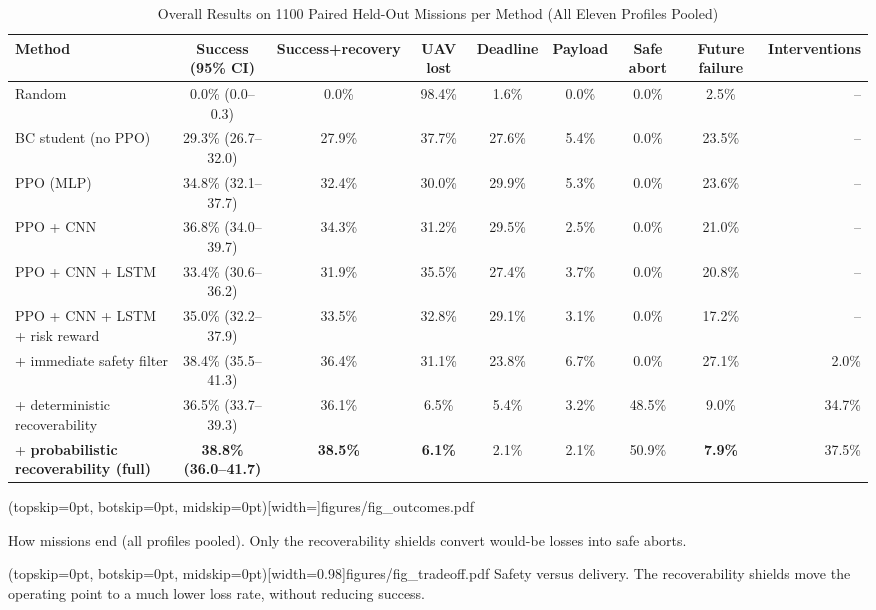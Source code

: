 \documentclass{ieeeaccess}
\newcommand{\widecap}[1]{\parbox[t]{0.89\textwidth}{\raggedright #1}}
\begin{document}
\begin{table}[t]
\caption{Overall Results on 1100 Paired Held-Out Missions per Method (All Eleven Profiles Pooled)}
\label{tab:overall}
\centering
\footnotesize
\setlength{\tabcolsep}{3.6pt}
\begin{tabular}{@{}lcccccccr@{}}
\toprule
Method & Success (95\% CI) & Success+recovery & UAV lost & Deadline & Payload & Safe abort & Future failure & Interventions \\
\midrule
Random & 0.0\% (0.0--0.3) & 0.0\% & 98.4\% & 1.6\% & 0.0\% & 0.0\% & 2.5\% & -- \\
BC student (no PPO) & 29.3\% (26.7--32.0) & 27.9\% & 37.7\% & 27.6\% & 5.4\% & 0.0\% & 23.5\% & -- \\
PPO (MLP) & 34.8\% (32.1--37.7) & 32.4\% & 30.0\% & 29.9\% & 5.3\% & 0.0\% & 23.6\% & -- \\
PPO + CNN & 36.8\% (34.0--39.7) & 34.3\% & 31.2\% & 29.5\% & 2.5\% & 0.0\% & 21.0\% & -- \\
PPO + CNN + LSTM & 33.4\% (30.6--36.2) & 31.9\% & 35.5\% & 27.4\% & 3.7\% & 0.0\% & 20.8\% & -- \\
PPO + CNN + LSTM + risk reward & 35.0\% (32.2--37.9) & 33.5\% & 32.8\% & 29.1\% & 3.1\% & 0.0\% & 17.2\% & -- \\
\quad + immediate safety filter & 38.4\% (35.5--41.3) & 36.4\% & 31.1\% & 23.8\% & 6.7\% & 0.0\% & 27.1\% & 2.0\% \\
\quad + deterministic recoverability & 36.5\% (33.7--39.3) & 36.1\% & 6.5\% & 5.4\% & 3.2\% & 48.5\% & 9.0\% & 34.7\% \\
\quad + \textbf{probabilistic recoverability (full)} & \textbf{38.8\% (36.0--41.7)} & \textbf{38.5\%} & \textbf{6.1\%} & 2.1\% & 2.1\% & 50.9\% & \textbf{7.9\%} & 37.5\% \\
\bottomrule
\end{tabular}
\end{table}

\Figure[t!](topskip=0pt, botskip=0pt, midskip=0pt)[width=\textwidth]{figures/fig_outcomes.pdf}
{\widecap{How missions end (all profiles pooled). Only the recoverability shields convert would-be losses into safe aborts.}\label{fig:outcomes}}

\Figure[t!](topskip=0pt, botskip=0pt, midskip=0pt)[width=0.98\columnwidth]{figures/fig_tradeoff.pdf}
{Safety versus delivery. The recoverability shields move the operating point to a much lower loss rate, without reducing success.\label{fig:tradeoff}}
\end{document}
